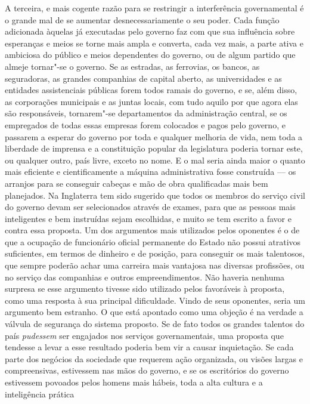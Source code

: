 A terceira, e mais cogente razão para se restringir a interferência
governamental é o grande mal de se aumentar desnecessariamente o seu
poder. Cada função adicionada àquelas já executadas pelo governo faz
com que sua influência sobre esperanças e meios se torne mais ampla e
converta, cada vez mais, a parte ativa e ambiciosa do público e meios
dependentes do governo, ou de algum partido que almeje tornar"-se o
governo. Se as estradas, as ferrovias, os bancos, as seguradoras, as
grandes companhias de capital aberto, as universidades e as entidades assistenciais
públicas forem todos ramais do governo, e se, além disso, as corporações
municipais e as juntas locais, com tudo aquilo por que agora elas são
responsáveis, tornarem"-se departamentos da administração central, se os
empregados de todas essas empresas forem colocados e pagos pelo
governo, e passarem a esperar do governo por toda e qualquer melhoria
de vida, nem toda a liberdade de imprensa e a constituição popular da
legislatura poderia tornar este, ou qualquer outro, país livre, exceto
no nome. E o mal seria ainda maior o quanto mais eficiente e
cientificamente a máquina administrativa fosse construída --- os
arranjos para se conseguir cabeças e mão de obra qualificadas mais bem
planejados. Na Inglaterra tem sido sugerido que todos os membros do
serviço civil do governo devam ser selecionados através de exames, para
que as pessoas mais inteligentes e bem instruídas sejam escolhidas, e
muito se tem escrito a favor e contra essa proposta. Um dos argumentos
mais utilizados pelos oponentes é o de que a ocupação de
funcionário oficial permanente do Estado não possui atrativos
suficientes, em termos de dinheiro e de posição, para conseguir os mais
talentosos, que sempre poderão achar uma carreira mais
vantajosa nas diversas profissões, ou no serviço das companhias e
outros empreendimentos. Não haveria nenhuma surpresa se esse argumento
tivesse sido utilizado pelos favoráveis à proposta, como uma resposta à
sua principal dificuldade. Vindo de seus oponentes, seria um argumento bem
estranho. O que está apontado como uma objeção é na verdade a válvula
de segurança do sistema proposto. Se de fato todos os grandes talentos
do país \textit{pudessem} ser engajados nos serviços governamentais,
uma proposta que tendesse a levar a esse resultado poderia bem vir a
causar inquietação. Se cada parte dos negócios da sociedade que
requerem ação organizada, ou visões largas e compreensivas, estivessem
nas mãos do governo, e se os escritórios do governo estivessem povoados
pelos homens mais hábeis, toda a alta cultura e a inteligência prática
